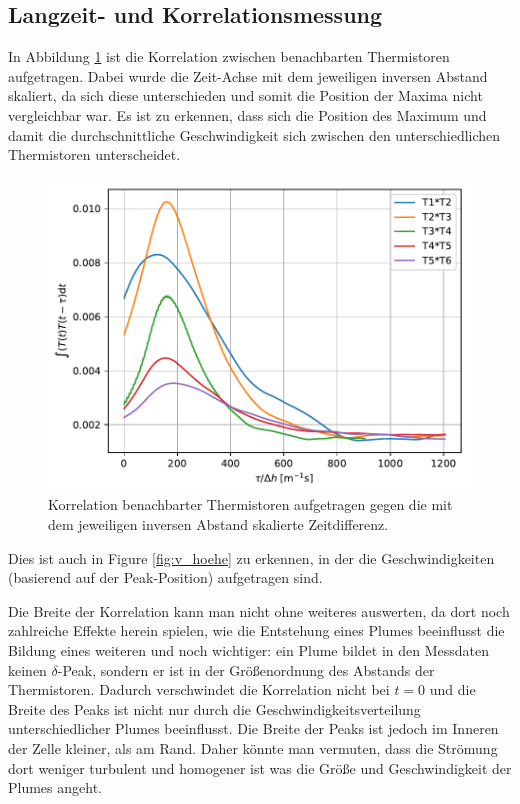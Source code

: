 \documentclass[12pt,a4paper,titlepage,headinclude]{scrartcl}
\numberwithin{equation}{subsection}
\begin{document}
\subsection{Langzeit- und Korrelationsmessung}
In Abbildung \ref{fig:tempcorell} ist die Korrelation zwischen benachbarten Thermistoren aufgetragen.
Dabei wurde die Zeit-Achse mit dem jeweiligen inversen Abstand skaliert, da sich diese unterschieden und somit die Position der Maxima nicht vergleichbar war.
Es ist zu erkennen, dass sich die Position des Maximum und damit die durchschnittliche Geschwindigkeit sich zwischen den unterschiedlichen Thermistoren unterscheidet.
\begin{figure}[h]
	\centering
	\includegraphics[width=0.7\linewidth]{tempcorell}
	\caption{Korrelation benachbarter Thermistoren aufgetragen gegen die mit dem jeweiligen inversen Abstand skalierte Zeitdifferenz.}
	\label{fig:tempcorell}
\end{figure}
Dies ist auch in Figure \ref{fig:v_hoehe} zu erkennen, in der die Geschwindigkeiten (basierend auf der Peak-Position) aufgetragen sind.

Die Breite der Korrelation kann man nicht ohne weiteres auswerten, da dort noch zahlreiche Effekte herein spielen, wie die Entstehung eines Plumes beeinflusst die Bildung eines weiteren und noch wichtiger: ein Plume bildet in den Messdaten keinen $\delta$-Peak, sondern er ist in der Größenordnung des Abstands der Thermistoren.
Dadurch verschwindet die Korrelation nicht bei $t=0$ und die Breite des Peaks ist nicht nur durch die Geschwindigkeitsverteilung unterschiedlicher Plumes beeinflusst.
Die Breite der Peaks ist jedoch im Inneren der Zelle kleiner, als am Rand.
Daher könnte man vermuten, dass die Strömung dort weniger turbulent und homogener ist was die Größe und Geschwindigkeit der Plumes angeht.
\end{document}

